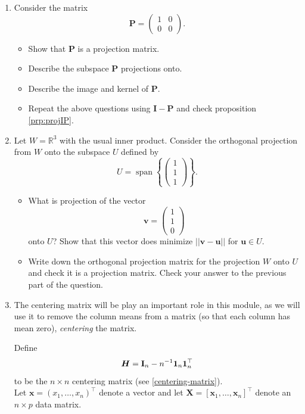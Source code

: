\documentclass[]{book}
\providecommand{\tightlist}{%
  \setlength{\itemsep}{0pt}\setlength{\parskip}{0pt}}
\theoremstyle{definition}
\theoremstyle{definition}
\theoremstyle{definition}
\theoremstyle{remark}
\begin{document}
\begin{enumerate}
\def\labelenumi{\arabic{enumi}.}
\setcounter{enumi}{5}
\item
  Consider the matrix \[\boldsymbol P=\left( \begin{array}{cc}1&0\\
  0&0\end{array}\right).\]

  \begin{itemize}
  \tightlist
  \item
    Show that \(\boldsymbol P\) is a projection matrix.
  \item
    Describe the subspace \(\boldsymbol P\) projections onto.
  \item
    Describe the image and kernel of \(\boldsymbol P\).
  \item
    Repeat the above questions using \(\mathbf I-\boldsymbol P\) and check proposition \ref{prp:projIP}.
  \end{itemize}
\item
  Let \(W=\mathbb{R}^3\) with the usual inner product.
  Consider the orthogonal projection from \(W\) onto the subspace \(U\) defined by
  \[U=\operatorname{span}\left\{\left(\begin{array}{c} 1\\1\\1\end{array}\right)\right\}.\]

  \begin{itemize}
  \tightlist
  \item
    What is projection of the vector \[\boldsymbol v=\left(\begin{array}{c} 1\\1\\0\end{array}\right)\]
    onto \(U\)? Show that this vector does minimize \(||\boldsymbol v-\boldsymbol u||\) for \(\boldsymbol u\in U\).
  \item
    Write down the orthogonal projection matrix for the projection \(W\) onto \(U\) and check it is a projection matrix. Check your answer to the previous part of the question.
  \end{itemize}
\item
  The centering matrix will be play an important role in this module, as we will use it to remove the column means from a matrix (so that each column has mean zero), \emph{centering} the matrix.

  Define \[\boldsymbol H=\mathbf I_n - n^{-1}{\bf 1}_n {\bf 1}_n^\top\] to be the \(n \times n\) centering matrix (see \ref{centering-matrix}).\\
  Let \(\boldsymbol x=(x_1, \ldots , x_n)^\top\) denote a vector and let \(\boldsymbol X=[\boldsymbol x_1 ,\ldots , \boldsymbol x_n]^\top\) denote an \(n \times p\) data matrix.


\end{enumerate}
\end{document}
